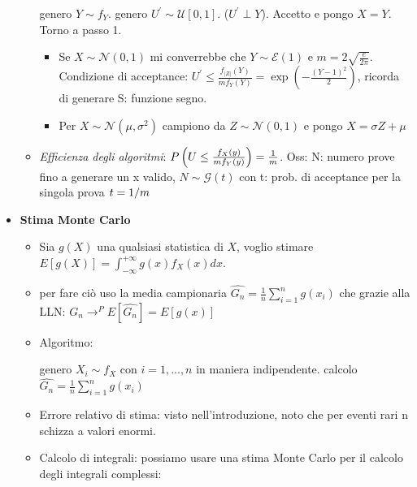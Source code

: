 \documentclass[8pt]{extarticle}
\begin{document}
\begin{multicols*}{3}
\begin{itemize}
\begin{itemize}
                        \begin{algorithmic}[1]
                            \State genero $Y\sim f_{Y}$.
                            \State genero $U^{'}\sim\mathcal{U}[0,1]$. ($U^{'}\perp Y$).
                            \State Accetto e pongo $X=Y$.
                            \Else
                            \State Torno a passo 1.
                            \EndIf
                        \end{algorithmic}
                        \begin{itemize}
                            \item Se $X\sim\mathcal{N}(0,1)$ mi converrebbe che $Y\sim\mathcal{E}(1)$ e $m=2\sqrt{\frac{e}{2\pi}}$.
                            Condizione di acceptance: $U^{'}\leq \frac{f_{|Z|}(Y)}{mf_{Y}(Y)}=\exp{(-\frac{(Y-1)^{2}}{2})}$, ricorda di generare S: funzione segno.
                            \item Per $X\sim\mathcal{N}(\mu,\sigma^{2})$ campiono da $Z\sim\mathcal{N}(0,1)$ e pongo $X=\sigma Z+\mu$
                        \end{itemize}
                  \item \textit{Efficienza degli algoritmi}: $P\left(U\leq \frac{f_{X}(y)}{mf_{Y}(y)}\right)=\frac{1}{m}\newline$.
                  Oss: N: numero prove fino a generare un x valido, $N\sim\mathcal{G}(t)$ con t: prob. di acceptance per la singola prova $t=1/m\newline \newline$ %
              \end{itemize}
        \item \textbf{Stima Monte Carlo}
              \begin{itemize}
                  \item Sia $g(X)$ una qualsiasi statistica di $X$, voglio stimare $E[g(X)]=\int_{-\infty}^{+\infty}g(x)f_X(x)dx$.
                  \item per fare ciò uso la media campionaria $\hat{G_{n}}=\frac{1}{n}\sum_{i=1}^{n}g(x_{i})$ che grazie alla LLN: $\hat{G_{n}} \rightarrow^{P}E[\hat{G_{n}}]=E[g(x)]$
                  \item Algoritmo:
                        \begin{algorithmic}[1]
                            \State genero $X_{i}\sim f_{X}$ con $ i=1,...,n$ in maniera indipendente.
                            \State calcolo $\hat{G_{n}}=\frac{1}{n}\sum_{i=1}^{n}g(x_{i})$
                        \end{algorithmic}
                  \item Errore relativo di stima: visto nell'introduzione, noto che per eventi rari n schizza a valori enormi.
                  \item Calcolo di integrali: possiamo usare una stima Monte Carlo per il calcolo degli integrali complessi:


\end{itemize}
\end{itemize}
\end{multicols*}
\end{document}
